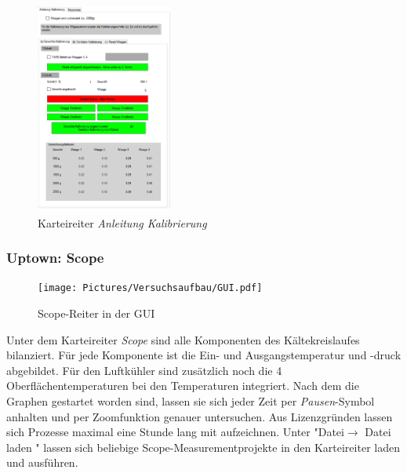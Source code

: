 \begin{figure}[htb]
\centering		\includegraphics[width=0.40\textwidth]{Pictures/GUI/AnleitungKalibrierung.png}
\caption{Karteireiter \textit{Anleitung Kalibrierung}}
\label{fig:AnleitungKalibrierung}
\end{figure}

\subsubsection*{Uptown: Scope}

\begin{figure}[htb]
\centering		\texttt{[image: Pictures/Versuchsaufbau/GUI.pdf]}
\caption{Scope-Reiter in der GUI}
\label{fig:RI}
\end{figure}

Unter dem Karteireiter \textit{Scope} sind alle Komponenten des Kältekreislaufes bilanziert. Für jede Komponente ist die Ein- und Ausgangstemperatur und -druck abgebildet. Für den Luftkühler sind zusätzlich noch die 4 Oberflächentemperaturen bei den Temperaturen integriert. Nach dem die Graphen gestartet worden sind, lassen sie sich jeder Zeit per \textit{Pausen}-Symbol anhalten und per Zoomfunktion genauer untersuchen. 
Aus Lizenzgründen lassen sich Prozesse maximal eine Stunde lang mit aufzeichnen. 
Unter "Datei$\rightarrow$ Datei laden " lassen sich beliebige Scope-Measurementprojekte in den Karteireiter laden und ausführen. 